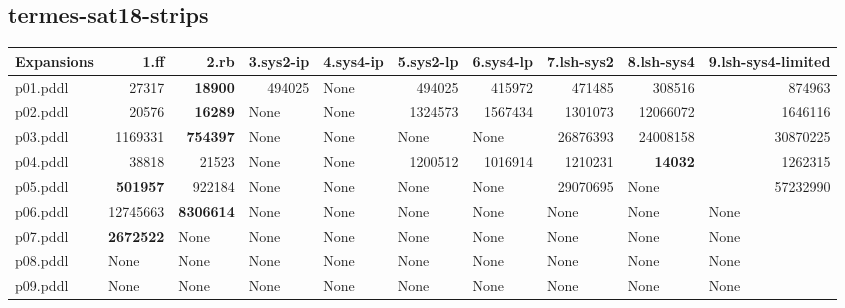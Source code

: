 \documentclass{article}
\begin{document}
\hypertarget{expansions-termes-sat18-strips}{}
\subsection*{termes-sat18-strips}

\begin{tabular}{@{}lrrrrrrrrr@{}}
Expansions & 1.ff & 2.rb & 3.sys2-ip & 4.sys4-ip & 5.sys2-lp & 6.sys4-lp & 7.lsh-sys2 & 8.lsh-sys4 & 9.lsh-sys4-limited \\
\midrule
p01.pddl & 27317 & \textbf{18900} & 494025 & \multicolumn{1}{|l|}{None} & 494025 & 415972 & 471485 & 308516 & 874963 \\
p02.pddl & 20576 & \textbf{16289} & \multicolumn{1}{|l|}{None} & \multicolumn{1}{|l|}{None} & 1324573 & 1567434 & 1301073 & 12066072 & 1646116 \\
p03.pddl & 1169331 & \textbf{754397} & \multicolumn{1}{|l|}{None} & \multicolumn{1}{|l|}{None} & \multicolumn{1}{|l|}{None} & \multicolumn{1}{|l|}{None} & 26876393 & 24008158 & 30870225 \\
p04.pddl & 38818 & 21523 & \multicolumn{1}{|l|}{None} & \multicolumn{1}{|l|}{None} & 1200512 & 1016914 & 1210231 & \textbf{14032} & 1262315 \\
p05.pddl & \textbf{501957} & 922184 & \multicolumn{1}{|l|}{None} & \multicolumn{1}{|l|}{None} & \multicolumn{1}{|l|}{None} & \multicolumn{1}{|l|}{None} & 29070695 & \multicolumn{1}{|l|}{None} & 57232990 \\
p06.pddl & 12745663 & \textbf{8306614} & \multicolumn{1}{|l|}{None} & \multicolumn{1}{|l|}{None} & \multicolumn{1}{|l|}{None} & \multicolumn{1}{|l|}{None} & \multicolumn{1}{|l|}{None} & \multicolumn{1}{|l|}{None} & \multicolumn{1}{|l|}{None} \\
p07.pddl & \textbf{2672522} & \multicolumn{1}{|l|}{None} & \multicolumn{1}{|l|}{None} & \multicolumn{1}{|l|}{None} & \multicolumn{1}{|l|}{None} & \multicolumn{1}{|l|}{None} & \multicolumn{1}{|l|}{None} & \multicolumn{1}{|l|}{None} & \multicolumn{1}{|l|}{None} \\
p08.pddl & \multicolumn{1}{|l|}{None} & \multicolumn{1}{|l|}{None} & \multicolumn{1}{|l|}{None} & \multicolumn{1}{|l|}{None} & \multicolumn{1}{|l|}{None} & \multicolumn{1}{|l|}{None} & \multicolumn{1}{|l|}{None} & \multicolumn{1}{|l|}{None} & \multicolumn{1}{|l|}{None} \\
p09.pddl & \multicolumn{1}{|l|}{None} & \multicolumn{1}{|l|}{None} & \multicolumn{1}{|l|}{None} & \multicolumn{1}{|l|}{None} & \multicolumn{1}{|l|}{None} & \multicolumn{1}{|l|}{None} & \multicolumn{1}{|l|}{None} & \multicolumn{1}{|l|}{None} & \multicolumn{1}{|l|}{None} \\

\end{tabular}
\end{document}
